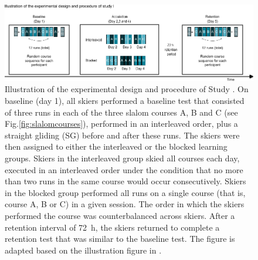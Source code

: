 \begin{figure}
    \centering
    \includegraphics[width=1\linewidth]{figure/figure_methods_CIdesign.pdf}
    \caption[Illustration of the experimental design and procedure of Study ]{Illustration of the experimental design and procedure of Study . On baseline (day 1), all skiers performed a baseline test that consisted of three runs in each of the three slalom courses A, B and C  (see Fig.\ref{fig:slalomcourses}), performed in an interleaved order, plus a straight gliding (SG) before and after these runs. The skiers were then assigned to either the interleaved or the blocked learning groups. Skiers in the interleaved group skied all courses each day, executed in an interleaved order under the condition that no more than two runs in the same course would occur consecutively. Skiers in the blocked group performed all runs on a single course (that is, course A, B or C) in a given session. The order in which the skiers performed the course was counterbalanced across skiers. After a retention interval of 72 h, the skiers returned to complete a retention test that was similar to the baseline test. The figure is adapted based on the illustration figure in \cite{magelssen_is_2022}.}
    \label{fig: ci_illustration}
\end{figure}


